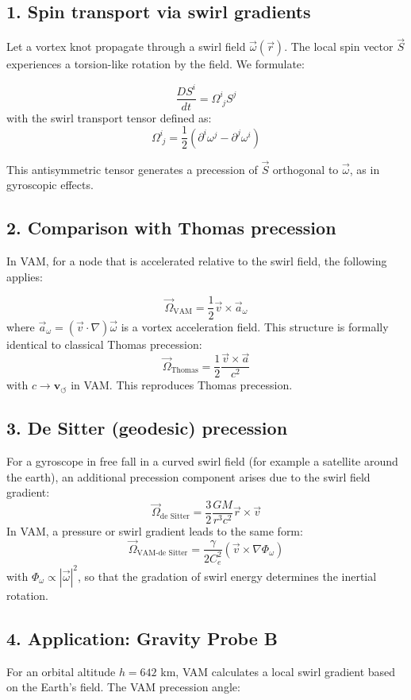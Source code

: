 \documentclass[a4paper, aps,preprint,superscriptaddress, 12pt]{revtex4}
\begin{document}
\subsection*{1. Spin transport via swirl gradients}
Let a vortex knot propagate through a swirl field \( \vec{\omega}(\vec{r}) \). The local spin vector \( \vec{S} \) experiences a torsion-like rotation by the field. We formulate:

\[
\frac{D S^i}{dt} = \Omega^i_{\;j} S^j
\]
with the swirl transport tensor defined as:
\[
\Omega^i_{\;j} = \frac{1}{2} \left( \partial^i \omega^j - \partial^j \omega^i \right)
\]

\noindent This antisymmetric tensor generates a precession of \( \vec{S} \) orthogonal to \( \vec{\omega} \), as in gyroscopic effects.

\subsection*{2. Comparison with Thomas precession}
In VAM, for a node that is accelerated relative to the swirl field, the following applies:

\[
\vec{\Omega}_\text{VAM} = \frac{1}{2} \vec{v} \times \vec{a}_{\omega}
\]
where \( \vec{a}_{\omega} = (\vec{v} \cdot \nabla) \vec{\omega} \) is a vortex acceleration field. This structure is formally identical to classical Thomas precession:
\[
\vec{\Omega}_\text{Thomas} = \frac{1}{2} \frac{\vec{v} \times \vec{a}}{c^2}
\]
with \( c \rightarrow \mathbf{v}_{\scriptscriptstyle\boldsymbol{\circlearrowleft}} \) in VAM. This reproduces Thomas precession.

\subsection*{3. De Sitter (geodesic) precession}
For a gyroscope in free fall in a curved swirl field (for example a satellite around the earth), an additional precession component arises due to the swirl field gradient:
\[
\vec{\Omega}_\text{de Sitter} = \frac{3}{2} \frac{GM}{r^3 c^2} \vec{r} \times \vec{v}
\]
In VAM, a pressure or swirl gradient leads to the same form:
\[
\vec{\Omega}_\text{VAM-de Sitter} = \frac{\gamma}{2 C_e^2} (\vec{v} \times \nabla \Phi_\omega)
\]
with \( \Phi_\omega \propto |\vec{\omega}|^2 \), so that the gradation of swirl energy determines the inertial rotation.

\subsection*{4. Application: Gravity Probe B}
For an orbital altitude \( h = 642 \) km, VAM calculates a local swirl gradient based on the Earth's field. The VAM precession angle:
\end{document}
